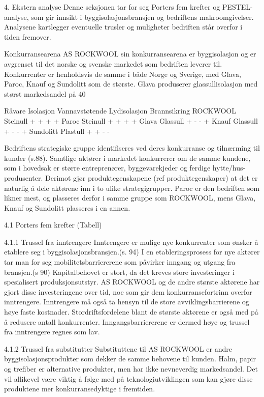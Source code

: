 4. Ekstern analyse
Denne seksjonen tar for seg Porters fem krefter og PESTEL- analyse, som gir innsikt i byggisolasjonsbransjen og bedriftens makroomgivelser. Analysene kartlegger eventuelle trusler og muligheter bedriften står overfor i tiden fremover.

Konkurransearena
AS ROCKWOOL sin konkurransearena er byggisolasjon og er avgrenset til det norske og svenske markedet som bedriften leverer til.  Konkurrenter er henholdsvis de samme i både Norge og Sverige, med Glava, Paroc, Knauf og Sundolitt som de største. Glava produserer glassullisolasjon med størst markedsandel på 40%




Råvare
Isolasjon
Vannavstøtende
Lydisolasjon
Brannsikring
ROCKWOOL
Steinull
+
+
+
+
Paroc
Steinull
+
+
+
+
Glava
Glassull
+
-
-
+
Knauf
Glassull
+
-
-
+
Sundolitt
Plastull
+
+
-
-


Bedriftens strategiske gruppe identifiseres ved deres konkurranse og tilnærming til kunder (s.88). Samtlige aktører i markedet konkurrerer om de samme kundene, som i hovedsak er større entreprenører, byggevarekjeder og ferdige hytte/hus-produsenter. Derimot gjør produktegenskapene (ref produktegenskaper) at det er naturlig å dele aktørene inn i to ulike strategigrupper. Paroc er den bedriften som likner mest, og plasseres derfor i samme gruppe som ROCKWOOL, mens Glava, Knauf og Sundolitt plasseres i en annen. 
 

4.1 Porters fem krefter
(Tabell)

4.1.1 Trussel fra inntrengere
Inntrengere er mulige nye konkurrenter som ønsker å etablere seg i byggisolasjonsbransjen.(s. 94) I en etableringsprosess for nye aktører tar man for seg mobilitetsbarriererene som påvirker inngang og utgang fra bransjen.(s 90) Kapitalbehovet er stort, da det kreves store investeringer i spesialisert produksjonsutstyr. AS ROCKWOOL og de andre største aktørene  har gjort disse investeringene over tid, noe som gir dem konkurransefortrinn overfor inntrengere. Inntrengere må også ta hensyn til de store avviklingsbarrierene og høye faste kostnader. Stordriftsfordelene blant de største aktørene er også med på å redusere antall konkurrenter. Inngangsbarriererene er dermed høye og trussel fra inntrengere regnes som lav.
 
4.1.2 Trussel fra substitutter
Substituttene til AS ROCKWOOL er andre byggisolasjonsprodukter som dekker de samme behovene til kunden. Halm, papir og trefiber er alternative produkter, men har ikke nevneverdig markedsandel. Det vil allikevel være viktig å følge med på teknologiutviklingen som kan gjøre disse produktene mer konkurransedyktige i fremtiden.


